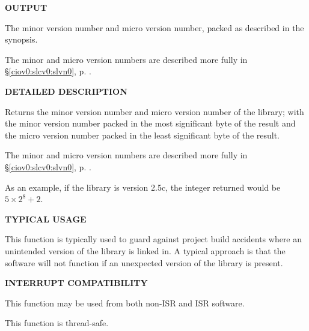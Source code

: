 \noindent\textbf{OUTPUT}
\begin{list}{}{\setlength{\leftmargin}{0.25in}\setlength{\topsep}{0.0in}}
\item The minor version number and micro version number, packed as
      described in the synopsis.
\item The minor and micro version numbers are described more fully
      in \S\ref{ciov0:slcv0:slvn0}, p. \pageref{ciov0:slcv0:slvn0}.
\end{list}
\vspace{2.8ex}

\noindent\textbf{DETAILED DESCRIPTION}
\begin{list}{}{\setlength{\leftmargin}{0.25in}\setlength{\topsep}{0.0in}}
\item Returns the minor version number and micro version number of the library;
      with the minor version number packed in the most significant byte of the
      result and the micro version number packed in the least significant byte
      of the result.
\item The minor and micro version numbers are described more fully
      in \S\ref{ciov0:slcv0:slvn0}, p. \pageref{ciov0:slcv0:slvn0}.
\item As an example,
      if the library is version 2.5c, the integer returned would be $5 \times 2^{8} + 2$.
\end{list}
\vspace{2.8ex}

\noindent\textbf{TYPICAL USAGE}
\begin{list}{}{\setlength{\leftmargin}{0.25in}\setlength{\topsep}{0.0in}}
\item This function is typically used to guard against project build accidents
      where an unintended version of the library is linked in.  A typical
      approach is that the software will not function if an unexpected version
      of the library is present.
\end{list}
\vspace{2.8ex}

\noindent\textbf{INTERRUPT COMPATIBILITY}
\begin{list}{}{\setlength{\leftmargin}{0.25in}\setlength{\topsep}{0.0in}}
\item This function may be used from both non-ISR and ISR software.
\item This function is thread-safe.
\end{list}
\vspace{2.8ex}

